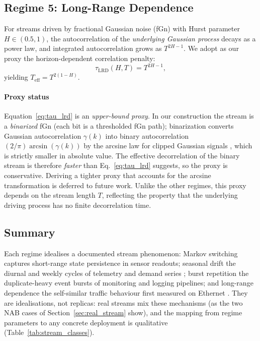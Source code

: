 \documentclass[sensors,article,submit,pdftex,moreauthors]{Definitions/mdpi}
\newcommand{\Teff}{T_{\mathrm{eff}}}
\begin{document}
\subsection{Regime 5: Long-Range Dependence}

For streams driven by fractional Gaussian noise (fGn) with Hurst parameter $H \in (0.5, 1)$, the autocorrelation of the \emph{underlying Gaussian process} decays as a power law, and integrated autocorrelation grows as $T^{2H-1}$. We adopt as our proxy the horizon-dependent correlation penalty:
\begin{equation}
    \tau_{\text{LRD}}(H, T) = T^{2H-1},
    \label{eq:tau_lrd}
\end{equation}
yielding $\Teff = T^{2(1-H)}$.

\paragraph{Proxy status} Equation~\eqref{eq:tau_lrd} is an \emph{upper-bound proxy}. In our construction the stream is a \emph{binarized} fGn (each bit is a thresholded fGn path); binarization converts Gaussian autocorrelation $\gamma(k)$ into binary autocorrelation $(2/\pi)\arcsin(\gamma(k))$ by the arcsine law for clipped Gaussian signals \citep{vanvleck1966spectrum}, which is strictly smaller in absolute value. The effective decorrelation of the binary stream is therefore \emph{faster} than Eq.~\eqref{eq:tau_lrd} suggests, so the proxy is conservative. Deriving a tighter proxy that accounts for the arcsine transformation is deferred to future work. Unlike the other regimes, this proxy depends on the stream length $T$, reflecting the property that the underlying driving process has no finite decorrelation time.

\subsection{Summary}

Each regime idealises a documented stream phenomenon: Markov switching captures short-range state persistence in sensor readouts; seasonal drift the diurnal and weekly cycles of telemetry and demand series \citep{gama2014driftsurvey, arora2024driftreview}; burst repetition the duplicate-heavy event bursts of monitoring and logging pipelines; and long-range dependence the self-similar traffic behaviour first measured on Ethernet \citep{leland1994ethernet, willinger1997selfsimilarity}. They are idealisations, not replicas: real streams mix these mechanisms (as the two NAB cases of Section~\ref{sec:real_stream} show), and the mapping from regime parameters to any concrete deployment is qualitative (Table~\ref{tab:stream_classes}).
\end{document}
